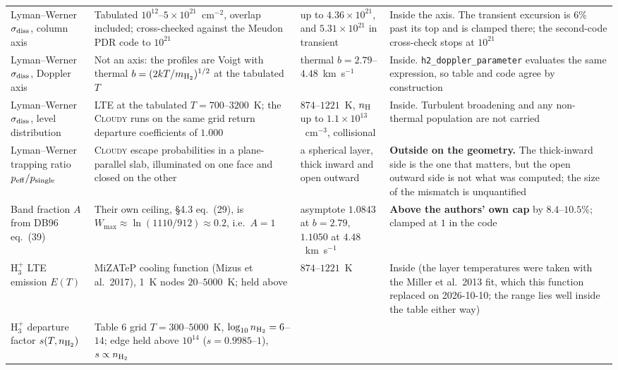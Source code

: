 \documentclass[english,a4paper]{my_memo}
\begin{document}
\begin{longtable}{@{}>{\raggedright\arraybackslash}p{}>{\raggedright\arraybackslash}p{}>{\raggedright\arraybackslash}p{}>{\raggedright\arraybackslash}p{}@{}}
Lyman--Werner $\sigma_{\rm diss}$, column axis
  & Tabulated $10^{12}$--$5\times10^{21}$~cm$^{-2}$, overlap included;
    cross-checked against the Meudon PDR code to $10^{21}$
  & up to $4.36\times10^{21}$, and $5.31\times10^{21}$ in transient
  & Inside the axis. The transient excursion is $6\%$ past its top and is
    clamped there; the second-code cross-check stops at $10^{21}$ \\
\addlinespace
Lyman--Werner $\sigma_{\rm diss}$, Doppler axis
  & Not an axis: the profiles are Voigt with thermal
    $b = (2kT/m_{\rm H_2})^{1/2}$ at the tabulated $T$
  & thermal $b = 2.79$--$4.48$~km~s$^{-1}$
  & Inside. \texttt{h2\_doppler\_parameter} evaluates the same expression, so
    table and code agree by construction \\
\addlinespace
Lyman--Werner $\sigma_{\rm diss}$, level distribution
  & LTE at the tabulated $T = 700$--$3200$~K; the \textsc{Cloudy} runs on the
    same grid return departure coefficients of $1.000$
  & $874$--$1221$~K, $n_{\rm H}$ up to $1.1\times10^{13}$~cm$^{-3}$,
    collisional
  & Inside. Turbulent broadening and any non-thermal population are not
    carried \\
\addlinespace
Lyman--Werner trapping ratio $p_{\rm eff}/p_{\rm single}$
  & \textsc{Cloudy} escape probabilities in a plane-parallel slab,
    illuminated on one face and closed on the other
  & a spherical layer, thick inward and open outward
  & \textbf{Outside on the geometry.} The thick-inward side is the one that
    matters, but the open outward side is not what was computed; the size of
    the mismatch is unquantified \\
\addlinespace
Band fraction $A$ from DB96 eq.~(39)
  & Their own ceiling, \S4.3 eq.~(29), is
    $W_{\max} \approx \ln(1110/912) \approx 0.2$, i.e.\ $A = 1$
  & asymptote $1.0843$ at $b = 2.79$, $1.1050$ at $4.48$~km~s$^{-1}$
  & \textbf{Above the authors' own cap} by $8.4$--$10.5\%$; clamped at $1$ in
    the code \\
\addlinespace
H$_3^+$ LTE emission $E(T)$
  & MiZATeP cooling function (Mizus et al.\ 2017), 1~K nodes $20$--$5000$~K;
    held above
  & $874$--$1221$~K
  & Inside (the layer temperatures were taken with the Miller et al.\ 2013
    fit, which this function replaced on 2026-10-10; the range lies well
    inside the table either way) \\
\addlinespace
H$_3^+$ departure factor $s(T, n_{\rm H_2})$
  & Table 6 grid $T = 300$--$5000$~K, $\log_{10} n_{\rm H_2} = 6$--$14$;
    edge held above $10^{14}$ ($s = 0.9985$--$1$), $s \propto n_{\rm H_2}$

\end{longtable}
\end{document}
